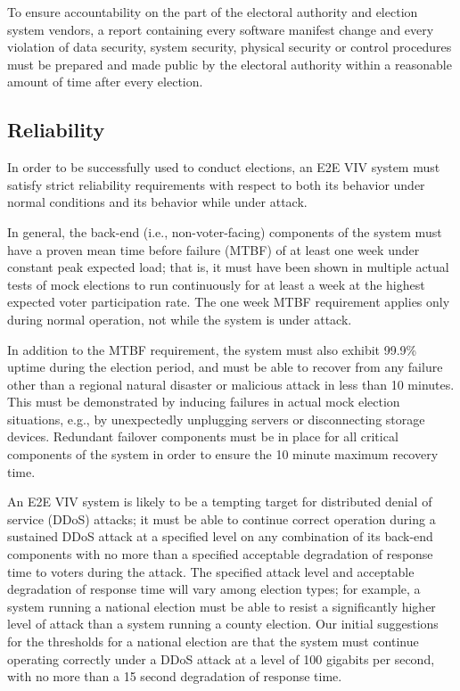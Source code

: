 To ensure accountability on the part of the electoral authority and
election system vendors, a report containing every software manifest
change and every violation of data security, system security, physical
security or control procedures must be prepared and made public by the
electoral authority within a reasonable amount of time after every
election.

\subsection{Reliability}

In order to be successfully used to conduct elections, an E2E VIV
system must satisfy strict reliability requirements with respect to
both its behavior under normal conditions and its behavior while under
attack.

In general, the back-end (i.e., non-voter-facing) components of the
system must have a proven mean time before failure (MTBF) of at least
one week under constant peak expected load; that is, it must have been
shown in multiple actual tests of mock elections to run continuously
for at least a week at the highest expected voter participation
rate. The one week MTBF requirement applies only during normal
operation, not while the system is under attack.

In addition to the MTBF requirement, the system must also exhibit
99.9\% uptime during the election period, and must be able to recover
from any failure other than a regional natural disaster or malicious
attack in less than 10 minutes. This must be demonstrated by inducing
failures in actual mock election situations, e.g., by unexpectedly
unplugging servers or disconnecting storage devices. Redundant
failover components must be in place for all critical components of
the system in order to ensure the 10 minute maximum recovery time.

An E2E VIV system is likely to be a tempting target for distributed
denial of service (DDoS) attacks; it must be able to continue correct
operation during a sustained DDoS attack at a specified level on any
combination of its back-end components with no more than a specified
acceptable degradation of response time to voters during the
attack. The specified attack level and acceptable degradation of
response time will vary among election types; for example, a system
running a national election must be able to resist a significantly
higher level of attack than a system running a county election. Our
initial suggestions for the thresholds for a national election are
that the system must continue operating correctly under a DDoS attack
at a level of 100 gigabits per second, with no more than a 15 second
degradation of response time.

